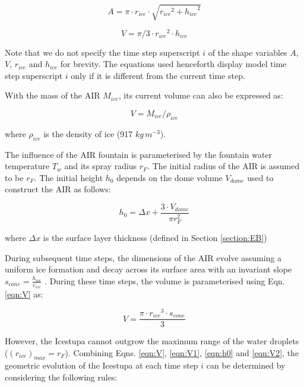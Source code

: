 \documentclass[utf8]{frontiersSCNS} %
\begin{document}
\begin{equation} A = \pi \cdot r_{ice} \cdot \sqrt{{r_{ice}}^2 + {h_{ice}}^ 2} \label{eqn:A} \end{equation}

\begin{equation} V = \pi/3 \cdot {r_{ice}}^2 \cdot h_{ice} \label{eqn:V} \end{equation}

Note that we do not specify the time step superscript $i$ of the shape variables $A$, $V$, $r_{ice}$ and $h_{ice}$ for
brevity.  The equations used henceforth display model time step superscript $i$ only if it is different from the
current time step.

With the mass of the AIR $M_{ice}$, its current volume can also be expressed as:

\begin{equation} V = M_{ice} /\rho_{ice} \label{eqn:V1} \end{equation}

where $\rho_{ice}$ is the density of ice (917 $kg\, m^{-3}$).


The influence of the AIR fountain is parameterised by the fountain water temperature $T_{w}$ and its spray radius $r_F$.
The initial radius of the AIR is assumed to be $r_F$. The initial height $h_0$ depends on the dome volume
$V_{dome}$ used to construct the AIR as follows:

\begin{equation}
	h_{0} =  \Delta x + \frac{3 \cdot V_{dome}}{\pi r_F^2 }
	\label{eqn:h0}
\end{equation}

where $\Delta x$ is the surface layer thickness (defined in Section \ref{section:EB})

During subsequent time steps, the dimensions of the AIR evolve assuming a uniform ice formation and decay across
its surface area with an invariant slope $s_{cone} = \frac{h_{ice}}{r_{ice}}$ .  During
these time steps, the volume is parameterised using Eqn. \ref{eqn:V} as:

\begin{equation} V = \frac{\pi \cdot {r_{ice}}^3
		\cdot s_{cone}}{3} \label{eqn:V2} \end{equation}


However, the Icestupa cannot outgrow the maximum range of the water droplets ($(r_{ice})_{max} = r_{F}$). Combining
Eqns. \ref{eqn:V},  \ref{eqn:V1}, \ref{eqn:h0} and \ref{eqn:V2}, the geometric evolution of the Icestupa at each time step $i$ can
be determined by considering the following rules:
\end{document}

